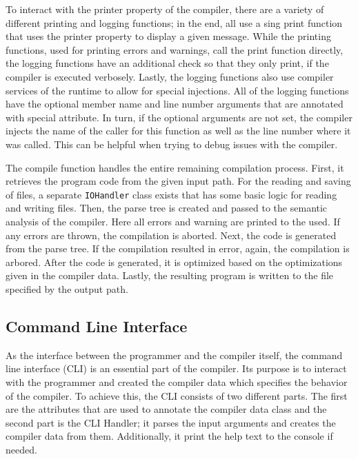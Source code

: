 To interact with the printer property of the compiler, there are a variety of different printing and logging functions; in the end, all use a sing print function that uses the printer property to display a given message. While the printing functions, used for printing errors and warnings, call the print function directly, the logging functions have an additional check so that they only print, if the compiler is executed verbosely. Lastly, the logging functions also use compiler services of the runtime to allow for special injections. All of the logging functions have the optional member name and line number arguments that are annotated with special attribute. In turn, if the optional arguments are not set, the compiler injects the name of the caller for this function as well as the line number where it was called. This can be helpful when trying to debug issues with the compiler.  

The compile function handles the entire remaining compilation process. First, it retrieves the program code from the given input path. For the reading and saving of files, a separate \texttt{IOHandler} class exists that has some basic logic for reading and writing files. Then, the parse tree is created and passed to the semantic analysis of the compiler. Here all errors and warning are printed to the used. If any errors are thrown, the compilation is aborted. Next, the code is generated from the parse tree. If the compilation resulted in error, again, the compilation is arbored. After the code is generated, it is optimized based on the optimizations given in the compiler data. Lastly, the resulting program is written to the file specified by the output path.

\subsection{Command Line Interface}
\label{sec:implementation_cli}
As the interface between the programmer and the compiler itself, the command line interface (CLI) is an essential part of the compiler. 
Its purpose is to interact with the programmer and created the compiler data which specifies the behavior of the compiler. 
To achieve this, the CLI consists of two different parts. The first are the attributes that are used to annotate the compiler data class and the second part is the CLI Handler; it parses the input arguments and creates the compiler data from them. Additionally, it print the help text to the console if needed.

